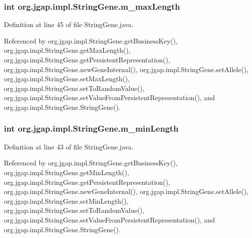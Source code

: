 \hypertarget{classorg_1_1jgap_1_1impl_1_1_string_gene_a6fda44f967e3b24f41d0d0219e3d79d3}{
\subsubsection[{m\-\_\-max\-Length}]{\setlength{\rightskip}{0pt plus 5cm}int org.\-jgap.\-impl.\-String\-Gene.\-m\-\_\-max\-Length\hspace{0.3cm}{\ttfamily [private]}}}\label{classorg_1_1jgap_1_1impl_1_1_string_gene_a6fda44f967e3b24f41d0d0219e3d79d3}


Definition at line 45 of file String\-Gene.\-java.



Referenced by org.\-jgap.\-impl.\-String\-Gene.\-get\-Business\-Key(), org.\-jgap.\-impl.\-String\-Gene.\-get\-Max\-Length(), org.\-jgap.\-impl.\-String\-Gene.\-get\-Persistent\-Representation(), org.\-jgap.\-impl.\-String\-Gene.\-new\-Gene\-Internal(), org.\-jgap.\-impl.\-String\-Gene.\-set\-Allele(), org.\-jgap.\-impl.\-String\-Gene.\-set\-Max\-Length(), org.\-jgap.\-impl.\-String\-Gene.\-set\-To\-Random\-Value(), org.\-jgap.\-impl.\-String\-Gene.\-set\-Value\-From\-Persistent\-Representation(), and org.\-jgap.\-impl.\-String\-Gene.\-String\-Gene().

\hypertarget{classorg_1_1jgap_1_1impl_1_1_string_gene_a25b50ba7f99ec2a0a8902688edabe789}{
\subsubsection[{m\-\_\-min\-Length}]{\setlength{\rightskip}{0pt plus 5cm}int org.\-jgap.\-impl.\-String\-Gene.\-m\-\_\-min\-Length\hspace{0.3cm}{\ttfamily [private]}}}\label{classorg_1_1jgap_1_1impl_1_1_string_gene_a25b50ba7f99ec2a0a8902688edabe789}


Definition at line 43 of file String\-Gene.\-java.



Referenced by org.\-jgap.\-impl.\-String\-Gene.\-get\-Business\-Key(), org.\-jgap.\-impl.\-String\-Gene.\-get\-Min\-Length(), org.\-jgap.\-impl.\-String\-Gene.\-get\-Persistent\-Representation(), org.\-jgap.\-impl.\-String\-Gene.\-new\-Gene\-Internal(), org.\-jgap.\-impl.\-String\-Gene.\-set\-Allele(), org.\-jgap.\-impl.\-String\-Gene.\-set\-Min\-Length(), org.\-jgap.\-impl.\-String\-Gene.\-set\-To\-Random\-Value(), org.\-jgap.\-impl.\-String\-Gene.\-set\-Value\-From\-Persistent\-Representation(), and org.\-jgap.\-impl.\-String\-Gene.\-String\-Gene().

